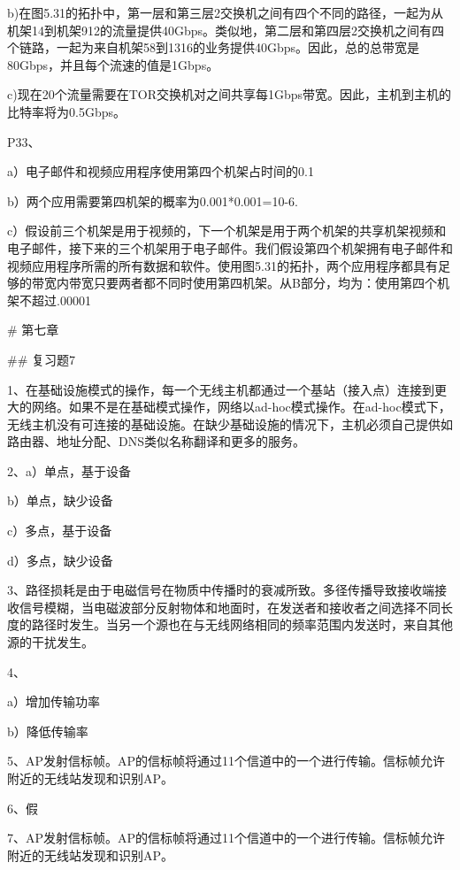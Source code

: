 \documentclass[11pt,UTF8,twoside]{article}
\begin{document}
{		b)在图5.31的拓扑中，第一层和第三层2交换机之间有四个不同的路径，一起为从机架14到机架912的流量提供40Gbps。类似地，第二层和第四层2交换机之间有四个链路，一起为来自机架58到1316的业务提供40Gbps。因此，总的总带宽是80Gbps，并且每个流速的值是1Gbps。
		
		c)现在20个流量需要在TOR交换机对之间共享每1Gbps带宽。因此，主机到主机的比特率将为0.5Gbps。
		
		P33、
		
		a）电子邮件和视频应用程序使用第四个机架占时间的0.1%
		
		b）两个应用需要第四机架的概率为0.001*0.001=10-6.
		
		c）假设前三个机架是用于视频的，下一个机架是用于两个机架的共享机架视频和电子邮件，接下来的三个机架用于电子邮件。我们假设第四个机架拥有电子邮件和视频应用程序所需的所有数据和软件。使用图5.31的拓扑，两个应用程序都具有足够的带宽内带宽只要两者都不同时使用第四机架。从B部分，均为：使用第四个机架不超过.00001%
		
		\newpage
	\pagestyle{fancy}
	\fancyhf{}  %
	\pagestyle{fancy}
		
		# 第七章
		
		## 复习题7 
		
		1、在基础设施模式的操作，每一个无线主机都通过一个基站（接入点）连接到更大的网络。如果不是在基础模式操作，网络以ad-hoc模式操作。在ad-hoc模式下，无线主机没有可连接的基础设施。在缺少基础设施的情况下，主机必须自己提供如路由器、地址分配、DNS类似名称翻译和更多的服务。
		
		2、a）单点，基于设备
		
		b）单点，缺少设备
		
		c）多点，基于设备
		
		d）多点，缺少设备
		
		3、路径损耗是由于电磁信号在物质中传播时的衰减所致。多径传播导致接收端接收信号模糊，当电磁波部分反射物体和地面时，在发送者和接收者之间选择不同长度的路径时发生。当另一个源也在与无线网络相同的频率范围内发送时，来自其他源的干扰发生。
		
		4、
		
		a）增加传输功率
		
		b）降低传输率
		
		5、AP发射信标帧。AP的信标帧将通过11个信道中的一个进行传输。信标帧允许附近的无线站发现和识别AP。
		
		6、假
		
		7、AP发射信标帧。AP的信标帧将通过11个信道中的一个进行传输。信标帧允许附近的无线站发现和识别AP。
		
}
\end{document}
